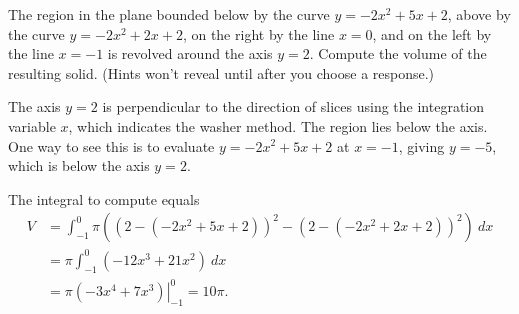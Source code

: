 \documentclass{ximera}
\begin{document}
\begin{question}%

The region in the plane bounded below by the curve \(y=-2x^2+5x+2\), above by the curve \(y=-2x^2+2x+2\), on the right by the line  \(x = 0\), and on the left by the line \(x = -1\) is revolved around the axis \(y = 2\). Compute the volume of the resulting solid.
(Hints won't reveal until after you choose a response.)
\begin{multiplechoice}
\choice[correct]{\(10\pi\)}
\choice{\(14\pi\)}
\choice{\(18\pi\)}
\choice{\(22\pi\)}
\choice{\(26\pi\)}
\choice{\(30\pi\)}
\end{multiplechoice}
\begin{feedback}
The axis \(y = 2\) is perpendicular to the direction of slices using the integration variable \(x\), which indicates the washer method. 
 The region lies below the axis. One way to see this is to evaluate \(y=-2x^2+5x+2\) at \(x = -1\), giving \(y = -5\), which is below the axis \(y = 2\).
 \begin{hint}
The integral to compute equals \[ \begin{aligned} V &= \int_{-1}^{0}\pi \left((2-(-2x^2+5x+2))^2 - (2-(-2x^2+2x+2))^2\right)~ dx\\
& = \pi \int_{-1}^{0} (-12x^3+21x^2)~ dx\\
& = \pi \left. \left(-3x^4+7x^3\right) \right|_{-1}^{0} = 10\pi. \end{aligned}\]
\end{hint}
\end{feedback}

\end{question}
\end{document}
